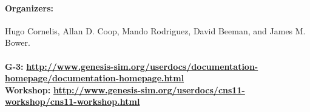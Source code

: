 \documentclass[12pt]{article}
\begin{document}
\paragraph*{Organizers:}
Hugo Cornelis, Allan D. Coop, Mando Rodriguez, David Beeman, and James M. Bower. \\

 \\
{\bf G-3:} {\scriptsize \href{http://www.genesis-sim.org/userdocs/documentation-homepage/documentation-homepage.html}{\bf http://www.genesis-sim.org/userdocs/documentation-homepage/documentation-homepage.html}} \\
{\bf Workshop:} {\scriptsize \href{http://www.genesis-sim.org/userdocs/cns11-workshop/cns11-workshop.html}{\bf http://www.genesis-sim.org/userdocs/cns11-workshop/cns11-workshop.html}}
\end{document}
